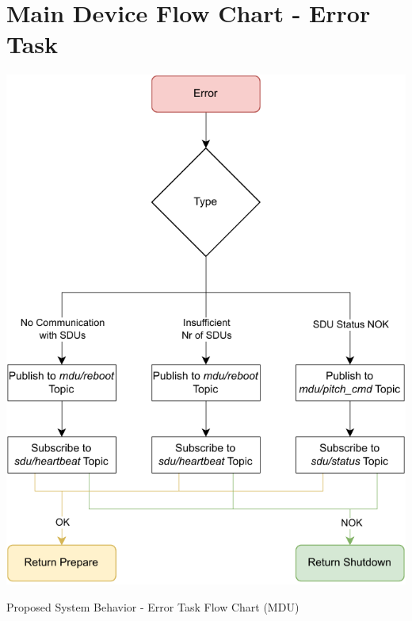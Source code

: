 
\chapter{Main Device Flow Chart - Error Task} %

\label{AppendixC}

\begin{algorithm}[H]
    \centering
    \includegraphics[scale=1]{appendices/assets/MDU_ERROR.pdf}
    \caption{Proposed System Behavior - Error Task Flow Chart (MDU)}
    \label{alg:MDU_ERROR}
\end{algorithm}

